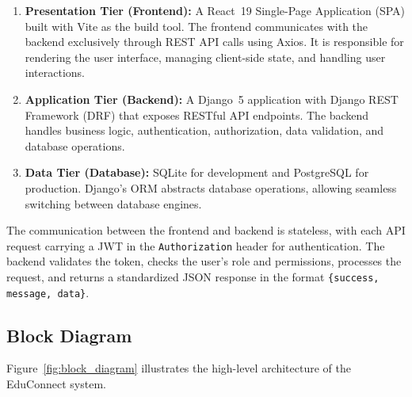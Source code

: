 \begin{enumerate}[label=\arabic*., leftmargin=2em]
    \item \textbf{Presentation Tier (Frontend):} A React~19 Single-Page Application (SPA) built with Vite as the build tool. The frontend communicates with the backend exclusively through REST API calls using Axios. It is responsible for rendering the user interface, managing client-side state, and handling user interactions.
    
    \item \textbf{Application Tier (Backend):} A Django~5 application with Django REST Framework (DRF) that exposes RESTful API endpoints. The backend handles business logic, authentication, authorization, data validation, and database operations.
    
    \item \textbf{Data Tier (Database):} SQLite for development and PostgreSQL for production. Django's ORM abstracts database operations, allowing seamless switching between database engines.
\end{enumerate}

The communication between the frontend and backend is stateless, with each API request carrying a JWT in the \texttt{Authorization} header for authentication. The backend validates the token, checks the user's role and permissions, processes the request, and returns a standardized JSON response in the format \texttt{\{success, message, data\}}.

\subsection{Block Diagram}

Figure~\ref{fig:block_diagram} illustrates the high-level architecture of the EduConnect system.

